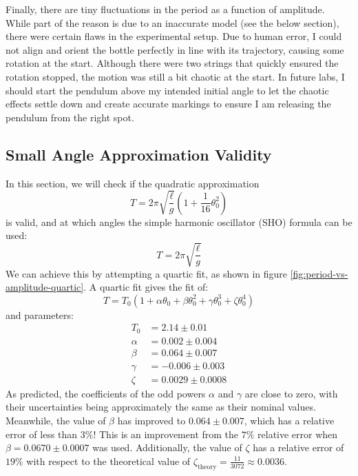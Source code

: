 \documentclass[%
 reprint,
 amsmath,amssymb
 aps,
]{revtex4-2}
\begin{document}
Finally, there are tiny fluctuations in the period as a function of amplitude. While part of the reason is due to an inaccurate model (see the below section), there were certain flaws in the experimental setup. Due to human error, I could not align and orient the bottle perfectly in line with its trajectory, causing some rotation at the start. Although there were two strings that quickly ensured the rotation stopped, the motion was still a bit chaotic at the start. In future labs, I should start the pendulum above my intended initial angle to let the chaotic effects settle down and create accurate markings to ensure I am releasing the pendulum from the right spot. 
\subsection{Small Angle Approximation Validity}
In this section, we will check if the quadratic approximation
\begin{equation}
    T = 2\pi\sqrt{\frac{\ell}{g}}\left(1+\frac{1}{16}\theta_0^2\right)
    \label{eq:}
\end{equation}
is valid, and at which angles the simple harmonic oscillator (SHO) formula can be used:
\begin{equation}
    T = 2\pi\sqrt{\frac{\ell}{g}}
    \label{eq:}
\end{equation}
We can achieve this by attempting a quartic fit, as shown in figure \ref{fig:period-vs-amplitude-quartic}. A quartic fit gives the fit of:
\begin{equation}
    T = T_0\left(1+\alpha\theta_0+\beta\theta_0^2+\gamma \theta_0^3+\zeta \theta_0^4\right)
    \label{eq:}
\end{equation}
and parameters:
\begin{align}
    T_0 &= 2.14 \pm 0.01 \\ 
    \alpha &= 0.002 \pm 0.004 \\ 
    \beta &= 0.064 \pm 0.007 \\ 
    \gamma &= -0.006 \pm 0.003 \\ 
    \zeta &= 0.0029 \pm 0.0008
    \label{eq:}
\end{align}
As predicted, the coefficients of the odd powers $\alpha$ and $\gamma$ are close to zero, with their uncertainties being approximately the same as their nominal values. Meanwhile, the value of $\beta$ has improved to $0.064\pm 0.007$, which has a relative error of less than $3\%$! This is an improvement from the $7\%$ relative error when $\beta=0.0670 \pm 0.0007$ was used. Additionally, the value of $\zeta$ has a relative error of $19\%$ with respect to the theoretical value of $\zeta_\text{theory}=\frac{11}{3072}\approx 0.0036$.
\end{document}
